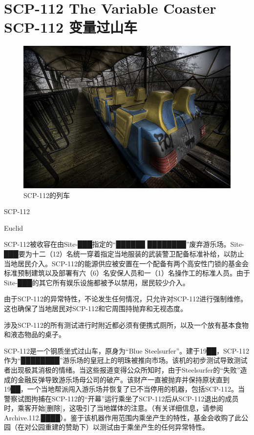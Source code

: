 \chapter[SCP-112 变量过山车]{
    SCP-112 The Variable Coaster\\
    SCP-112 变量过山车
}

\label{chap:SCP-112}

\begin{figure}[H]
    \centering
    \includegraphics[width=0.5\linewidth]{images/SCP-112.jpg}
    \caption*{SCP-112的列车}
\end{figure}

SCP-112

Euclid

SCP-112被收容在由Site-███指定的“██████ ████████”废弃游乐场。Site-███要为十二（12）名统一穿着指定当地服装的武装警卫配备标准补给，以防止当地居民介入。SCP-112的能源供应被安置在一个配备有两个高安性门锁的基金会标准预制建筑以及部署有六（6）名安保人员和一（1）名操作工的标准人员。由于Site-███的其它所有娱乐设施都被予以禁用，居民较少介入。

由于SCP-112的异常特性，不论发生任何情况，只允许对SCP-112进行强制维修。这也确保了当地居民对SCP-112和它周围持抛弃和无视态度。

涉及SCP-112的所有测试进行时附近都必须有便携式厕所，以及一个放有基本食物和液态物品的桌子。

SCP-112是一个钢质坐式过山车，原身为“Blue Steelsurfer”。建于19██，SCP-112作为“████████”游乐场的皇冠上的明珠被推向市场。该机的初步测试导致测试者出现极其消极的情绪。当这些报道变得公众所知时，由于Steelsurfer的“失败”造成的金融反弹导致游乐场母公司的破产。该财产一直被抛弃并保持原状直到19██，一个当地帮派闯入游乐场并恢复了已不当停用的机器，包括SCP-112。当警察试图拘捕在SCP-112的“开幕”运行乘坐了SCP-112后从SCP-112退出的成员时，乘客开始{[}删除]，这吸引了当地媒体的注意。（有关详细信息，请参阅Archive.112.████）。鉴于该机器作用范围内乘坐产生的特性，基金会收购了此公园（在对公园重建的赞助下）以测试由于乘坐产生的任何异常特性。

